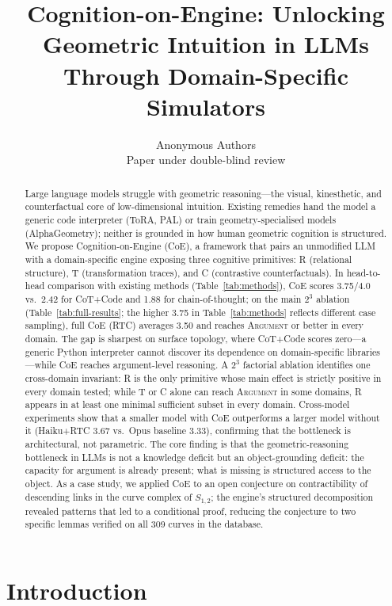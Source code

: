 \documentclass{article}
\title{Cognition-on-Engine: Unlocking Geometric Intuition in LLMs Through Domain-Specific Simulators}
\author{%
  Anonymous Authors \\
  Paper under double-blind review \\
}
\begin{document}
\maketitle

\begin{abstract}
Large language models struggle with geometric reasoning---the visual, kinesthetic, and counterfactual core of low-dimensional intuition. Existing remedies hand the model a generic code interpreter (ToRA, PAL) or train geometry-specialised models (AlphaGeometry); neither is grounded in how human geometric cognition is structured. We propose Cognition-on-Engine (CoE), a framework that pairs an unmodified LLM with a domain-specific engine exposing three cognitive primitives: R (relational structure), T (transformation traces), and C (contrastive counterfactuals). In head-to-head comparison with existing methods (Table~\ref{tab:methods}), CoE scores 3.75/4.0 vs.\ 2.42 for CoT+Code and 1.88 for chain-of-thought; on the main $2^3$ ablation (Table~\ref{tab:full-results}; the higher 3.75 in Table~\ref{tab:methods} reflects different case sampling), full CoE (RTC) averages 3.50 and reaches \textsc{Argument} or better in every domain. The gap is sharpest on surface topology, where CoT+Code scores zero---a generic Python interpreter cannot discover its dependence on domain-specific libraries---while CoE reaches argument-level reasoning. A $2^3$ factorial ablation identifies one cross-domain invariant: R is the only primitive whose main effect is strictly positive in every domain tested; while T or C alone can reach \textsc{Argument} in some domains, R appears in at least one minimal sufficient subset in every domain. Cross-model experiments show that a smaller model with CoE outperforms a larger model without it (Haiku+RTC 3.67 vs.\ Opus baseline 3.33), confirming that the bottleneck is architectural, not parametric. The core finding is that the geometric-reasoning bottleneck in LLMs is not a knowledge deficit but an object-grounding deficit: the capacity for argument is already present; what is missing is structured access to the object. As a case study, we applied CoE to an open conjecture on contractibility of descending links in the curve complex of $S_{1,2}$; the engine's structured decomposition revealed patterns that led to a conditional proof, reducing the conjecture to two specific lemmas verified on all 309 curves in the database.
\end{abstract}

\section{Introduction}
\label{sec:intro}
\end{document}
